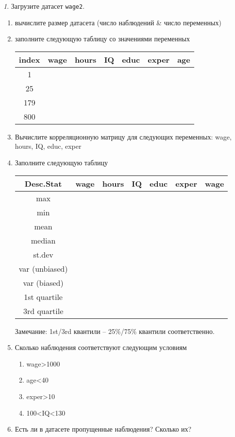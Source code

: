 \documentclass[12pt]{article}
\theoremstyle{remark}
\newtheorem{exercise}{}[section]
\begin{document}
\begin{exercise}
Загрузите датасет \texttt{wage2}.
\begin{enumerate}
	\item вычислите размер датасета (число наблюдений \& число переменных)
	\item заполните следующую таблицу со значениями переменных
	\begin{center}
		\begin{tabular}{|c|c|c|c|c|c|c|} \hline
			index & wage & hours& IQ & educ & exper & age \\ \hline\hline
			1 & & & & & & \\ \hline
			25 & & & &  & & \\ \hline
			179 & & & & & & \\ \hline
			800 & & & & & & \\ \hline
		\end{tabular}
	\end{center}
	\item Вычислите корреляционную матрицу для следующих переменных: wage, hours, IQ, educ, exper 
	\item Заполните следующую таблицу
	\begin{center}
		\begin{tabular}{|c|c|c|c|c|c|c|} \hline
			Desc.Stat & wage & hours& IQ & educ & exper & wage \\ \hline\hline
			max & & & & & & \\ \hline
			min & & & & & & \\ \hline
			mean & & & & & & \\ \hline
			median & & & & & & \\ \hline
			st.dev & & & & & & \\ \hline
			var (unbiased) & & & & & & \\ \hline
			var (biased) & & & & & & \\ \hline
			1st quartile & & & & & & \\ \hline
			3rd quartile & & & & & & \\ \hline
		\end{tabular}
	\end{center}
	Замечание: 1st/3rd квантили -- 25\%/75\% квантили соответственно.
	\item Сколько наблюдения соответствуют следующим условиям
		\begin{enumerate}
			\item wage>1000
			\item age<40
			\item exper>10
			\item 100<IQ<130
		\end{enumerate}
	\item Есть ли в датасете пропущенные наблюдения?
	Сколько их?
\end{enumerate}
\end{exercise}
\end{document}
